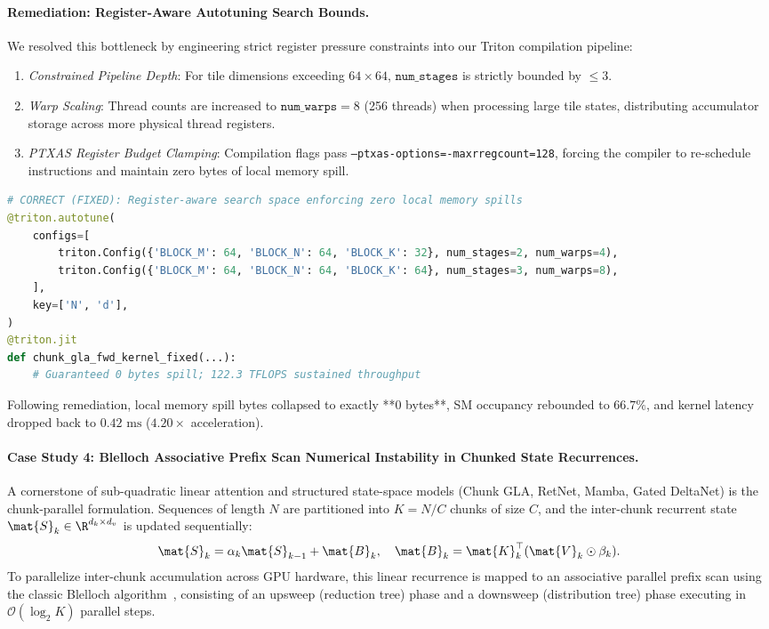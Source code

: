 \paragraph{Remediation: Register-Aware Autotuning Search Bounds.}
We resolved this bottleneck by engineering strict register pressure constraints into our Triton compilation pipeline:
\begin{enumerate}
    \item \emph{Constrained Pipeline Depth}: For tile dimensions exceeding $64 \times 64$, $\texttt{num\_stages}$ is strictly bounded by $\le 3$.
    \item \emph{Warp Scaling}: Thread counts are increased to $\texttt{num\_warps} = 8$ (256 threads) when processing large tile states, distributing accumulator storage across more physical thread registers.
    \item \emph{PTXAS Register Budget Clamping}: Compilation flags pass \texttt{--ptxas-options=-maxrregcount=128}, forcing the compiler to re-schedule instructions and maintain zero bytes of local memory spill.
\end{enumerate}
\begin{lstlisting}[language=Python]
# CORRECT (FIXED): Register-aware search space enforcing zero local memory spills
@triton.autotune(
    configs=[
        triton.Config({'BLOCK_M': 64, 'BLOCK_N': 64, 'BLOCK_K': 32}, num_stages=2, num_warps=4),
        triton.Config({'BLOCK_M': 64, 'BLOCK_N': 64, 'BLOCK_K': 64}, num_stages=3, num_warps=8),
    ],
    key=['N', 'd'],
)
@triton.jit
def chunk_gla_fwd_kernel_fixed(...):
    # Guaranteed 0 bytes spill; 122.3 TFLOPS sustained throughput
\end{lstlisting}
Following remediation, local memory spill bytes collapsed to exactly **0 bytes**, SM occupancy rebounded to $66.7\%$, and kernel latency dropped back to $0.42\text{ ms}$ ($4.20\times$ acceleration).

\paragraph{Case Study 4: Blelloch Associative Prefix Scan Numerical Instability in Chunked State Recurrences.}
\label{sec:case_study_blelloch_prefix_instability}
A cornerstone of sub-quadratic linear attention and structured state-space models (Chunk GLA, RetNet, Mamba, Gated DeltaNet) is the chunk-parallel formulation. Sequences of length $N$ are partitioned into $K = N / C$ chunks of size $C$, and the inter-chunk recurrent state $\mat{S}_k \in \R^{d_k \times d_v}$ is updated sequentially:
\begin{equation}
    \mat{S}_k = \alpha_k \mat{S}_{k-1} + \mat{B}_k, \quad \mat{B}_k = \mat{K}_k^\top (\mat{V}_k \odot \beta_k).
    \label{eq:chunk_recurrence_matrix}
\end{equation}
To parallelize inter-chunk accumulation across GPU hardware, this linear recurrence is mapped to an associative parallel prefix scan using the classic Blelloch algorithm~\cite{blelloch1990prefix}, consisting of an upsweep (reduction tree) phase and a downsweep (distribution tree) phase executing in $\mathcal{O}(\log_2 K)$ parallel steps.

